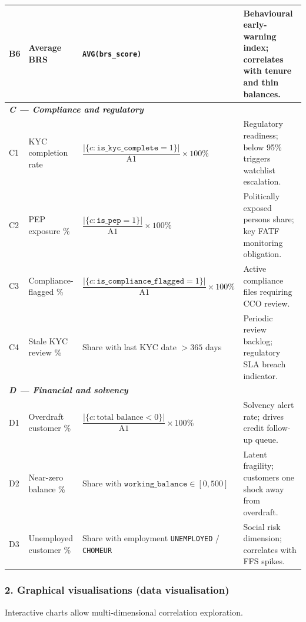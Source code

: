 \begin{table}[H]
\begin{tabular}{|p{0.6cm}|p{3.0cm}|p{5.1cm}|p{5.6cm}|}
\hline
B6 & Average BRS & \texttt{AVG(brs\_score)} & Behavioural early-warning index; correlates with tenure and thin balances. \\
\hline
\multicolumn{4}{|l|}{\cellcolor{blue!8}\textit{\textbf{C --- Compliance and regulatory}}} \\
\hline
C1 & KYC completion rate & $\dfrac{|\{c:\texttt{is\_kyc\_complete}=1\}|}{\text{A1}}\times 100\%$ & Regulatory readiness; below 95\% triggers watchlist escalation. \\
\hline
C2 & PEP exposure \% & $\dfrac{|\{c:\texttt{is\_pep}=1\}|}{\text{A1}}\times 100\%$ & Politically exposed persons share; key FATF monitoring obligation. \\
\hline
C3 & Compliance-flagged \% & $\dfrac{|\{c:\texttt{is\_compliance\_flagged}=1\}|}{\text{A1}}\times 100\%$ & Active compliance files requiring CCO review. \\
\hline
C4 & Stale KYC review \% & Share with last KYC date $>365$ days & Periodic review backlog; regulatory SLA breach indicator. \\
\hline
\multicolumn{4}{|l|}{\cellcolor{blue!8}\textit{\textbf{D --- Financial and solvency}}} \\
\hline
D1 & Overdraft customer \% & $\dfrac{|\{c:\text{total balance}<0\}|}{\text{A1}}\times 100\%$ & Solvency alert rate; drives credit follow-up queue. \\
\hline
D2 & Near-zero balance \% & Share with $\texttt{working\_balance}\in[0,500]$ & Latent fragility; customers one shock away from overdraft. \\
\hline
D3 & Unemployed customer \% & Share with employment \texttt{UNEMPLOYED} / \texttt{CHOMEUR} & Social risk dimension; correlates with FFS spikes. \\
\hline
\end{tabular}
\end{table}

\subsubsection*{2. Graphical visualisations (data visualisation)}
Interactive charts allow multi-dimensional correlation exploration.

